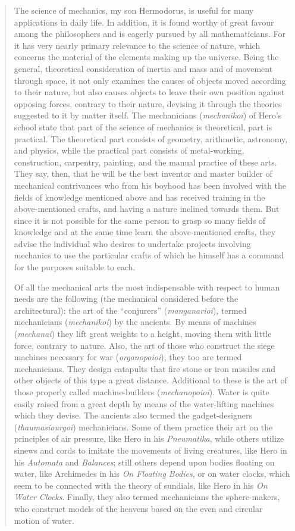 \documentclass{article}
\begin{document}
\begin{quote}
The science of mechanics, my son Hermodorus, is useful for many
applications in daily life. In addition, it is found worthy of great favour among
the philosophers and is eagerly pursued by all mathematicians. For it has very
nearly primary relevance to the science of nature, which concerns the material of
the elements making up the universe. Being the general, theoretical consideration
of inertia and mass and of movement through space, it not only examines the
causes of objects moved according to their nature, but also causes objects to
leave their own position against opposing forces, contrary to their nature,
devising it through the theories suggested to it by matter itself. The
mechanicians ({\em mechanikoi}) of Hero's school state that part of the science of
mechanics is theoretical, part is practical. The theoretical part consists of
geometry, arithmetic, astronomy, and physics, while the practical part consists
of metal-working, construction, carpentry, painting, and the manual practice of
these arts. They say, then, that he will be the best inventor and master builder of
mechanical contrivances who from his boyhood has been involved with the fields
of knowledge mentioned above and has received training in the above-mentioned
crafts, and having a nature inclined towards them. But since it is not possible for
the same person to grasp so many fields of knowledge and at the same time learn
the above-mentioned crafts, they advise the individual who desires to undertake
projects involving mechanics to use the particular crafts of which he himself has
a command for the purposes suitable to each.

Of all the mechanical arts the most indispensable with respect to human
needs are the following (the mechanical considered before the architectural): the
art of the ``conjurers'' ({\em manganarioi}), termed mechanicians ({\em mechanikoi}) by the
ancients. By means of machines ({\em mechanai}) they lift great weights to a height,
moving them with little force, contrary to nature. Also, the art of those who
construct the siege machines necessary for war ({\em organopoioi}), they too are termed
mechanicians. They design catapults that fire stone or iron missiles and other 
objects of this type a great distance. Additional to these is the art of those
properly called machine-builders ({\em mechanopoioi}). Water is quite easily raised
from a great depth by means of the water-lifting machines which they devise.
The ancients also termed the gadget-designers ({\em thaumasiourgoi}) mechanicians.
Some of them practice their art on the principles of air pressure, like Hero in his
{\em Pneumatika}, while others utilize sinews and cords to imitate the movements of
living creatures, like Hero in his {\em Automata} and {\em Balances}; still others depend
upon bodies floating on water, like Archimedes in his {\em On Floating Bodies}, or on
water clocks, which seem to be connected with the theory of sundials, like Hero
in his {\em On Water Clocks}. Finally, they also termed  mechanicians the sphere-makers,
who construct models of the heavens based on the even and circular
motion of water.
\end{quote}
\end{document}
